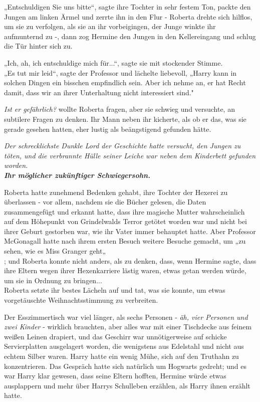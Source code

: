 {„Entschuldigen Sie uns bitte“, sagte ihre Tochter in sehr festem Ton, packte den Jungen am linken Ärmel und zerrte ihn in den Flur - Roberta drehte sich hilflos, um sie zu verfolgen, als sie an ihr vorbeigingen, der Junge winkte ihr aufmunternd zu -, dann zog Hermine den Jungen in den Kellereingang und schlug die Tür hinter sich zu.

„Ich, ah, ich entschuldige mich für...“, sagte sie mit stockender Stimme.\\ „Es tut mir leid“, sagte der Professor und lächelte liebevoll, „Harry kann in solchen Dingen ein bisschen empfindlich sein. Aber ich nehme an, er hat Recht damit, dass wir an ihrer Unterhaltung nicht interessiert sind."

\emph{Ist er gefährlich?} wollte Roberta fragen, aber sie schwieg und versuchte, an subtilere Fragen zu denken. Ihr Mann neben ihr kicherte, als ob er das, was sie gerade gesehen hatten, eher lustig als beängstigend gefunden hätte.

\emph{Der schrecklichste Dunkle Lord der Geschichte hatte versucht, den Jungen zu töten, und die verbrannte Hülle seiner Leiche war neben dem Kinderbett gefunden worden.}\\ \textbf{\emph{Ihr möglicher zukünftiger Schwiegersohn.}}

Roberta hatte zunehmend Bedenken gehabt, ihre Tochter der Hexerei zu überlassen - vor allem, nachdem sie die Bücher gelesen, die Daten zusammengefügt und erkannt hatte, dass ihre magische Mutter wahrscheinlich auf dem Höhepunkt von Grindelwalds Terror getötet worden war und nicht bei ihrer Geburt gestorben war, wie ihr Vater immer behauptet hatte. Aber Professor McGonagall hatte nach ihrem ersten Besuch weitere Besuche gemacht, um „zu sehen, wie es Miss Granger geht„\\ ; und Roberta konnte nicht anders, als zu denken, dass, wenn Hermine sagte, dass ihre Eltern wegen ihrer Hexenkarriere lästig waren, etwas getan werden würde, um sie in Ordnung zu bringen...\\ Roberta setzte ihr bestes Lächeln auf und tat, was sie konnte, um etwas vorgetäuschte Weihnachtsstimmung zu verbreiten.

Der Esszimmertisch war viel länger, als sechs Personen - \emph{äh, vier Personen und zwei Kinder} - wirklich brauchten, aber alles war mit einer Tischdecke aus feinem weißen Leinen drapiert, und das Geschirr war unnötigerweise auf schicke Servierplatten ausgelagert worden, die wenigstens aus Edelstahl und nicht aus echtem Silber waren. Harry hatte ein wenig Mühe, sich auf den Truthahn zu konzentrieren. Das Gespräch hatte sich natürlich um Hogwarts gedreht; und es war Harry klar gewesen, dass seine Eltern hofften, Hermine würde etwas ausplappern und mehr über Harrys Schulleben erzählen, als Harry ihnen erzählt hatte.

}
